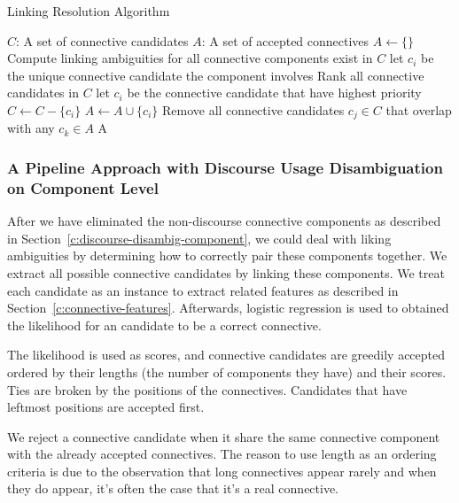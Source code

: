\begin{algorithm}
    \caption{Linking Resolution Algorithm}
    \label{a:linking-resolve}
    \begin{algorithmic}[1]
        \Require
            $C$: A set of connective candidates
        \Ensure
            $A$: A set of accepted connectives
        \State $A \gets \{\}$
            \State Compute linking ambiguities for all connective components exist in $C$
                \State let $ c_i $ be the unique connective candidate the component involves
            \Else
                \State Rank all connective candidates in $ C $
                \State let $ c_i $ be the connective candidate that have highest priority
            \EndIf
                \State $C \gets C - \{c_i\}$
                \State $A \gets A \cup \{c_i\}$
            \State Remove all connective candidates $ c_j \in C $ that overlap with any $ c_k \in A $
        \EndWhile
        \State \Return A
    \end{algorithmic}
\end{algorithm}

\subsubsection{A Pipeline Approach with Discourse Usage Disambiguation on Component Level}
\label{c:pipeline1}

After we have eliminated the non-discourse connective components as described
in Section~\ref{c:discourse-disambig-component}, we could
deal with liking ambiguities by determining how to correctly pair these
components together. We extract all possible connective candidates by
linking these components. We treat each candidate as an instance to
extract related features as described in Section~\ref{c:connective-features}.
Afterwards, logistic regression is used to obtained the likelihood for an
candidate to be a correct connective.

The likelihood is used as scores, and connective candidates are greedily accepted
ordered by their lengths (the number of components they have) and their scores.
Ties are broken by the positions of the connectives. Candidates that have
leftmost positions are accepted first.

We reject a connective candidate when it share the same connective component
with the already accepted connectives. The reason to use length as an ordering
criteria is due to the observation that long connectives appear rarely
and when they do appear, it's often the case that it's a real connective.

